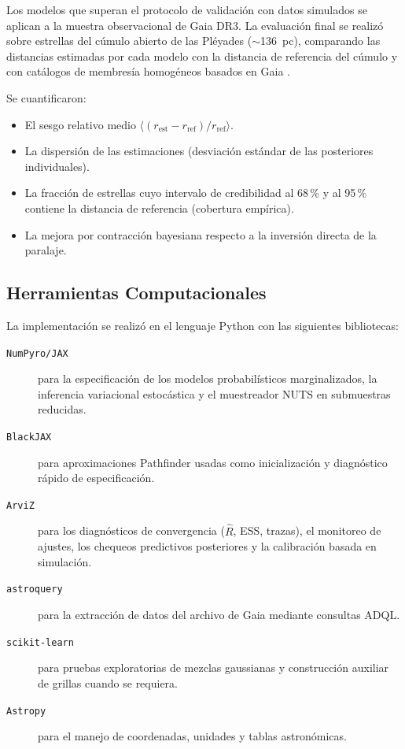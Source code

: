 \documentclass[stu, 12pt, letterpaper, donotrepeattitle, floatsintext, natbib]{apa7_ula}
\begin{document}
Los modelos que superan el protocolo de validación con datos simulados
se aplican a la muestra observacional de Gaia DR3. La evaluación
final se realizó sobre estrellas del cúmulo abierto de las Pléyades
($\sim$136~pc), comparando las distancias estimadas por cada modelo
con la distancia de referencia del cúmulo
\citep{Galli_2017} y con catálogos de membresía homogéneos basados en
Gaia \citep{CantatGaudin_2018}.

Se cuantificaron:
\begin{itemize}
    \item El sesgo relativo medio $\langle (r_{\text{est}} -
    r_{\text{ref}}) / r_{\text{ref}} \rangle$.
    \item La dispersión de las estimaciones (desviación estándar de
    las posteriores individuales).
    \item La fracción de estrellas cuyo intervalo de credibilidad al
    68\,\%{} y al 95\,\%{} contiene la distancia de referencia
    (cobertura empírica).
    \item La mejora por contracción bayesiana respecto a la inversión
    directa de la paralaje.
\end{itemize}

\subsection{Herramientas Computacionales}

La implementación se realizó en el lenguaje Python con las siguientes
bibliotecas:
\begin{description}
    \item[\texttt{NumPyro/JAX}] para la especificación de los modelos
    probabilísticos marginalizados, la inferencia variacional
    estocástica y el muestreador NUTS \citep{Hoffman_Gelman_2014} en
    submuestras reducidas.
    \item[\texttt{BlackJAX}] para aproximaciones Pathfinder usadas como
    inicialización y diagnóstico rápido de especificación.
    \item[\texttt{ArviZ}] para los diagnósticos de convergencia
    ($\hat{R}$, ESS, trazas), el monitoreo de ajustes, los chequeos
    predictivos posteriores y la calibración basada en simulación.
    \item[\texttt{astroquery}] para la extracción de datos del
    archivo de Gaia mediante consultas ADQL.
    \item[\texttt{scikit-learn}] para pruebas exploratorias de mezclas
    gaussianas y construcción auxiliar de grillas cuando se requiera.
    \item[\texttt{Astropy}] para el manejo de coordenadas, unidades
    y tablas astronómicas.
\end{description}
\end{document}
